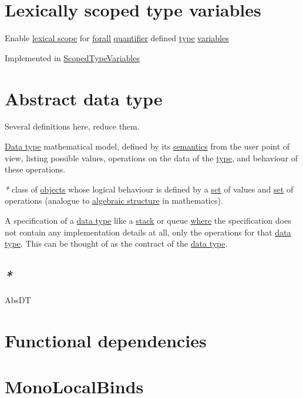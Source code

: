 \documentclass[a4paper,14pt,oneside]{book}
\begin{document}
\chapter{\label{orgfff7c55}Lexically scoped type variables}
\label{sec:org120974c}

Enable \hyperref[orgb84e7aa]{lexical scope} for \hyperref[orgf213738]{forall} \hyperref[org9864683]{quantifier} defined \hyperref[org6743858]{type} \hyperref[orgda45931]{variables}

Implemented in \hyperref[org3b48ed4]{ScopedTypeVariables}

\chapter{\label{org4d1f55c}Abstract data type}
\label{sec:org89dd2f6}

Several definitions here, reduce them.

\hyperref[org4f1341a]{Data type} mathematical model, defined by its \hyperref[org1a27f78]{semantics} from the user point of view, listing possible values, operations on the data of the \hyperref[org6743858]{type}, and behaviour of these operations.

\emph{*} class of \hyperref[orgbc943a8]{objects} whose logical behaviour is defined by a \hyperref[org4194165]{set} of values and \hyperref[org4194165]{set} of operations (analogue to \hyperref[orgacd59d2]{algebraic structure} in mathematics).

A specification of a \hyperref[org4f1341a]{data type} like a \hyperref[orgb64c943]{stack} or queue \hyperref[orgaf8c8ec]{where} the specification does not contain any implementation details at all, only the operations for that \hyperref[org4f1341a]{data type}. This can be thought of as the contract of the \hyperref[org4f1341a]{data type}. 

\section{\emph{*}}
\label{sec:orgb117809}

\label{orgd394d87}AbsDT

\chapter{\label{org6cbc67b}Functional dependencies}
\label{sec:org64e6982}

\chapter{\label{org9c490bc}MonoLocalBinds}
\label{sec:org3f6bd5b}
\end{document}
